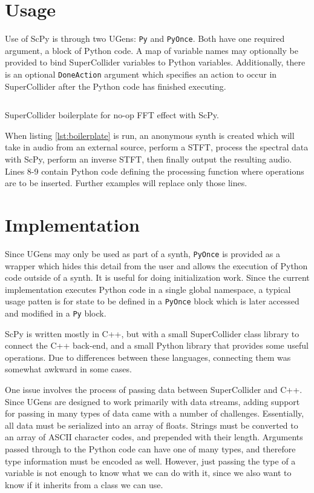 \documentclass{article}
\begin{document}
\section{Usage}

Use of ScPy is through two UGens: \texttt{Py} and \texttt{PyOnce}. Both have one required argument,
a block of Python code. A map of variable names may optionally be provided to bind SuperCollider
variables to Python variables.  Additionally, there is an optional \texttt{DoneAction} argument which
specifies an action to occur in SuperCollider after the Python code has finished executing.

\begin{listing}[H] \inputminted[linenos=true]{SuperCollider}{../examples/template.sc}
\caption{SuperCollider boilerplate for no-op FFT effect with ScPy.} \label{lst:boilerplate}
\end{listing}

When listing \ref{lst:boilerplate} is run, an anonymous synth is created which will take in audio
from an external source, perform a STFT, process the spectral data with ScPy, perform an inverse
STFT, then finally output the resulting audio. Lines 8-9 contain Python code defining the
processing function where operations are to be inserted. Further examples will replace only those
lines.

\section{Implementation}

Since UGens may only be used as part of a synth, \texttt{PyOnce} is provided as a wrapper which
hides this detail from the user and allows the execution of Python code outside of a synth. It is
useful for doing initialization work.  Since the current implementation executes Python code in a
single global namespace, a typical usage patten is for state to be defined in a \texttt{PyOnce}
block which is later accessed and modified in a \texttt{Py} block.

ScPy is written mostly in C++, but with a small SuperCollider class library to connect the C++
back-end, and a small Python library that provides some useful operations. Due to differences
between these languages, connecting them was somewhat awkward in some cases.

One issue involves the process of passing data between SuperCollider and C++. Since UGens are
designed to work primarily with data streams, adding support for passing in many types of data came
with a number of challenges. Essentially, all data must be serialized into an array of floats.
Strings must be converted to an array of ASCII character codes, and prepended with their length.
Arguments passed through to the Python code can have one of many types, and therefore type
information must be encoded as well. However, just passing the type of a variable is not enough to
know what we can do with it, since we also want to know if it inherits from a class we can use.
\end{document}
